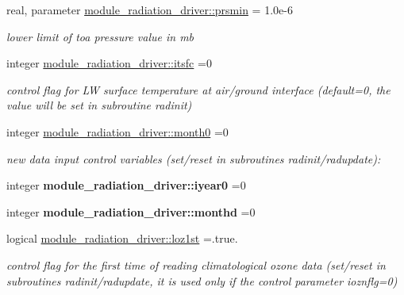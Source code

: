 \begin{DoxyCompactItemize}
real, parameter \hyperlink{group__module__radiation__driver_ga3fc43ca0d2c5f69a380ddb4f0926ecc7}{module\+\_\+radiation\+\_\+driver\+::prsmin} = 1.\+0e-\/6
\begin{DoxyCompactList}\small\item\em lower limit of toa pressure value in mb \end{DoxyCompactList}\item 
\mbox{\label{group__module__radiation__driver_ga9ee6a89464bf206cc07ea30d7eeaaeb8}} 
integer \hyperlink{group__module__radiation__driver_ga9ee6a89464bf206cc07ea30d7eeaaeb8}{module\+\_\+radiation\+\_\+driver\+::itsfc} =0
\begin{DoxyCompactList}\small\item\em control flag for LW surface temperature at air/ground interface (default=0, the value will be set in subroutine radinit) \end{DoxyCompactList}\item 
\mbox{\label{group__module__radiation__driver_ga6eb268f296c77047f389ed6fac5f95be}} 
integer \hyperlink{group__module__radiation__driver_ga6eb268f296c77047f389ed6fac5f95be}{module\+\_\+radiation\+\_\+driver\+::month0} =0
\begin{DoxyCompactList}\small\item\em new data input control variables (set/reset in subroutines radinit/radupdate)\+: \end{DoxyCompactList}\item 
\mbox{\label{group__module__radiation__driver_ga4d755de48d0aa83f337a2a907ac7d8a2}} 
integer {\bfseries module\+\_\+radiation\+\_\+driver\+::iyear0} =0
\item 
\mbox{\label{group__module__radiation__driver_gac4baf8ff048aaa5b85d03cc42c579c7b}} 
integer {\bfseries module\+\_\+radiation\+\_\+driver\+::monthd} =0
\item 
\mbox{\label{group__module__radiation__driver_gaf6e0e1ef2ebb78f57c897ebaf633edd2}} 
logical \hyperlink{group__module__radiation__driver_gaf6e0e1ef2ebb78f57c897ebaf633edd2}{module\+\_\+radiation\+\_\+driver\+::loz1st} =.true.
\begin{DoxyCompactList}\small\item\em control flag for the first time of reading climatological ozone data (set/reset in subroutines radinit/radupdate, it is used only if the control parameter ioznflg=0) \end{DoxyCompactList}\item 

\end{DoxyCompactItemize}
